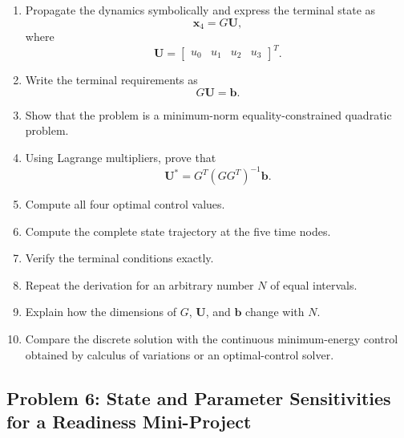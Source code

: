 \begin{enumerate}
    \item Propagate the dynamics symbolically and express the terminal state
    as
    \begin{equation}
    \mathbf{x}_4
    =
    G\mathbf{U},
    \end{equation}
    where
    \begin{equation}
    \mathbf{U}
    =
    \begin{bmatrix}
    u_0&u_1&u_2&u_3
    \end{bmatrix}^{T}.
    \end{equation}

    \item Write the terminal requirements as
    \begin{equation}
    G\mathbf{U}
    =
    \mathbf{b}.
    \end{equation}

    \item Show that the problem is a minimum-norm equality-constrained
    quadratic problem.

    \item Using Lagrange multipliers, prove that
    \begin{equation}
    \mathbf{U}^*
    =
    G^T
    \left(
    GG^T
    \right)^{-1}
    \mathbf{b}.
    \end{equation}

    \item Compute all four optimal control values.

    \item Compute the complete state trajectory at the five time nodes.

    \item Verify the terminal conditions exactly.

    \item Repeat the derivation for an arbitrary number $N$ of equal
    intervals.

    \item Explain how the dimensions of $G$, $\mathbf{U}$, and
    $\mathbf{b}$ change with $N$.

    \item Compare the discrete solution with the continuous minimum-energy
    control obtained by calculus of variations or an optimal-control
    solver.
\end{enumerate}


\subsection*{Problem 6: State and Parameter Sensitivities for a Readiness Mini-Project}

